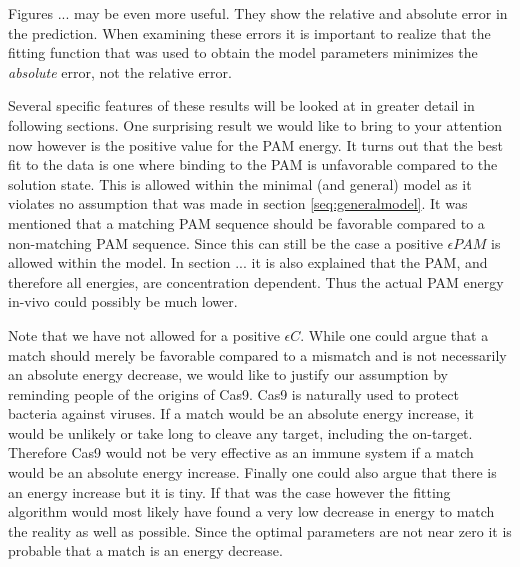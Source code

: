 \begin{table}
\begin{center}
\label{tab:MinModelResults}
\end{center}
\end{table}

Figures ... %
may be even more useful. They show the relative and absolute error in the prediction. When examining these errors it is important to realize that the fitting function that was used to obtain the model parameters minimizes the \textit{absolute} error, not the relative error.


Several specific features of these results will be looked at in greater detail in following sections. One surprising result we would like to bring to your attention now however is the positive value for the PAM energy. It turns out that the best fit to the data is one where binding to the PAM is unfavorable compared to the solution state. This is allowed within the minimal (and general) model as it violates no assumption that was made in section \ref{seq:generalmodel}. It was mentioned that a matching PAM sequence should be favorable compared to a non-matching PAM sequence. Since this can still be the case a positive $\epsilon PAM$ is allowed within the model. In section ... %
it is also explained that the PAM, and therefore all energies, are concentration dependent. Thus the actual PAM energy in-vivo could possibly be much lower. %

Note that we have not allowed for a positive $\epsilon C$. While one could argue that a match should merely be favorable compared to a mismatch and is not necessarily an absolute energy decrease, we would like to justify our assumption by reminding people of the origins of Cas9. Cas9 is naturally used to protect bacteria against viruses. If a match would be an absolute energy increase, it would be unlikely or take long to cleave any target, including the on-target. Therefore Cas9 would not be very effective as an immune system if a match would be an absolute energy increase. Finally one could also argue that there is an energy increase but it is tiny. If that was the case however the fitting algorithm would most likely have found a very low decrease in energy to match the reality as well as possible. Since the optimal parameters are not near zero it is probable that a match is an energy decrease. 

